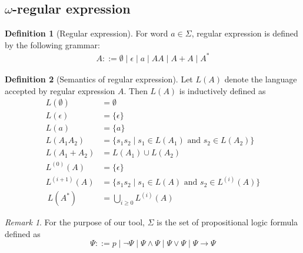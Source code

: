 \documentclass[preprint,12pt]{elsarticle}
\theoremstyle{definition}
\newtheorem{definition}{Definition}[section]
\theoremstyle{remark}
\newtheorem{remark}{Remark}[section]
\newcommand{\limplies}{\rightarrow}
\begin{document}
\subsection{$\omega$-regular expression}
\begin{definition}[Regular expression]
    For word $a \in \Sigma$, regular expression is defined by the following grammar:
    \begin{align*}
        A ::= \emptyset \mid \epsilon \mid a \mid AA \mid A + A \mid A^*
    \end{align*}
\end{definition}
\begin{definition}[Semantics of regular expression]
    Let $L(A)$ denote the language accepted by regular expression $A$. Then $L(A)$ is inductively defined as
    \begin{align*}
        L(\emptyset) & = \emptyset \\
        L(\epsilon) & = \{\epsilon\} \tag{$\epsilon$ denotes the empty string}\\
        L(a) & = \{a\} \\
        L(A_1A_2) & = \{s_1s_2 \mid s_1 \in L(A_1) \text{ and } s_2 \in L(A_2)\} \\
        L(A_1 + A_2) & = L(A_1) \cup L(A_2) \\
        L^{(0)}(A) & = \{\epsilon\} \\
        L^{(i + 1)}(A) & = \{s_1s_2 \mid s_1 \in L(A) \text{ and } s_2 \in L^{(i)}(A)\} \\\
        L(A^*) & = \bigcup_{i \ge 0} L^{(i)}(A)
    \end{align*}
\end{definition}

\begin{remark}
    For the purpose of our tool, $\Sigma$ is the set of propositional logic formula defined as
    \[
    \Psi ::= p \mid \neg \Psi \mid \Psi \land \Psi \mid \Psi \lor \Psi \mid \Psi \limplies \Psi
    \]
\end{remark}
\end{document}

